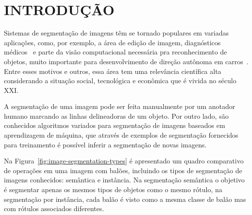 \chapter{INTRODUÇÃO}\label{cap:introducao}

Sistemas de segmentação de imagens têm se tornado populares em
variadas aplicações, como, por exemplo, a área de edição de imagem,
diagnósticos médicos~\cite{zhou2019interactive} e parte da visão
computacional necessária pra reconhecimento de objetos, muito
importante para desenvolvimento de direção autônoma em
carros~\cite{feng2021review}. Entre esses motivos e outros, essa área
tem uma relevância científica alta considerando a situação social,
tecnológica e econômica que é vivida no século XXI.\@

A segmentação de uma imagem pode ser feita manualmente por um anotador
humano marcando as linhas delineadoras de um objeto. Por outro lado,
são conhecidos algoritmos variados para segmentação de imagens baseados
em aprendizagem de máquina, que através de exemplos de segmentação
fornecidos para treinamento é possível inferir a segmentação de novas imagens.

Na Figura~\ref{fig:image-segmentation-types} é apresentado um quadro
comparativo de operações em uma imagem com balões, incluindo os tipos
de segmentação de imagens conhecidos: semântica e instância. Na
segmentação semântica o objetivo é segmentar apenas os mesmos tipos de
objetos como o mesmo rótulo, na segmentação por instância, cada balão
é visto como a mesma classe de balão mas com rótulos associados diferentes.

\begin{figure}[h!]
        \captionsetup{width=16cm}
		\centering
\end{figure}


